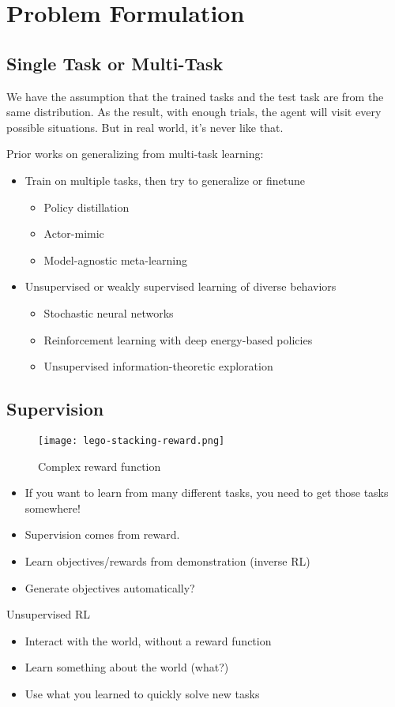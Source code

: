 \section{Problem Formulation}
\subsection{Single Task or Multi-Task}
We have the assumption that the trained tasks and the test task are from the same distribution. As the result, with enough trials, the agent will visit every possible situations. But in real world, it's never like that.

Prior works on generalizing from multi-task learning:
\begin{itemize}
	\item Train on multiple tasks, then try to generalize or finetune
	\begin{itemize}
		\item Policy distillation \cite{rusu2015policy}
		\item Actor-mimic \cite{parisotto2015actor}
		\item Model-agnostic meta-learning \cite{finn2017model}
	\end{itemize}
	\item Unsupervised or weakly supervised learning of diverse behaviors
	\begin{itemize}
		\item Stochastic neural networks \cite{florensa2017stochastic}
		\item Reinforcement learning with deep energy-based policies \cite{haarnoja2017reinforcement}
		\item Unsupervised information-theoretic exploration
	\end{itemize}
\end{itemize}

\subsection{Supervision}
\begin{figure}[hbt!]
	\centering
	\texttt{[image: lego-stacking-reward.png]}
	\caption{Complex reward function \cite{popov2017data}}
	\label{fig:lego-stacking-reward}
\end{figure}

\begin{itemize}
	\item If you want to learn from many different tasks, you need to get those tasks somewhere!
	\item Supervision comes from reward.
	\item Learn objectives/rewards from demonstration (inverse \ac{RL})
	\item Generate objectives automatically?
\end{itemize}

Unsupervised \ac{RL}
\begin{itemize}
	\item Interact with the world, without a reward function
	\item Learn something about the world (what?)
	\item Use what you learned to quickly solve new tasks
\end{itemize}